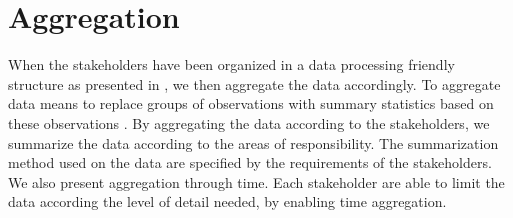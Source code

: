 \section{Aggregation} %
\label{sec:intro_aggregation}
When the stakeholders have been organized in a data processing friendly
structure as presented in , we then aggregate the 
data accordingly. To aggregate data means to replace groups of observations
with summary statistics based on these observations \cite{ wiki:Aggregation}.
By aggregating the data according to the stakeholders, we summarize the data
according to the areas of responsibility. The summarization method used on the 
data are specified by the requirements of the stakeholders. We also present
aggregation through time. Each stakeholder are able to limit the data 
according the level of detail needed, by enabling time aggregation.
\\



